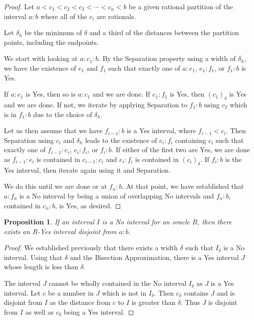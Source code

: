 \documentclass[12pt]{article}
\newtheorem{proposition}{Proposition}[subsection]
\begin{document}
\begin{proof}

Let $a < c_1 < c_2 < c_3 < \cdots < c_n < b$ be a given rational partition of the interval $a:b$ where all of the $c_i$ are rationals. 

Let $\delta_h$ be the minimum of $\delta$ and a third of the distances between the partition points, including the endpoints. 

We start with looking at $a:c_1:b$. By the Separation property using a width of $\delta_h$, we have the existence of $e_1$ and $f_1$ such that exactly one of $a:e_1$, $e_1:f_1$, or $f_1:b$ is Yes. 

If $a:e_1$ is Yes, then so is $a:c_1$ and we are done. If $e_1:f_1$ is Yes, then $(c_1)_\delta$ is Yes and we are done. If not, we iterate by applying Separation to $f_1:b$ using $c_2$ which is in $f_1:b$ due to the choice of $\delta_h$. 

Let us then assume that we have $f_{i-1}:b$ is a Yes interval, where $f_{i-1} < c_i$.  Then Separation using $c_i$ and $\delta_h$ leads to the existence of $e_i:f_i$ containing $c_i$ such that exactly one of $f_{i-1}:e_i$, $e_i:f_i$, or $f_i:b$. If either of the first two are Yes, we are done as $f_{i-1}:e_i$ is contained in $c_{i-1}:c_i$ and $e_i:f_i$ is contained in $(c_i)_\delta$. If $f_i:b$ is the Yes interval, then iterate again using it and Separation. 

We do this until we are done or at $f_n:b$. At that point, we have established that $a:f_n$ is a No interval by being a union of overlapping No intervals and $f_n:b$, contained in $c_n:b$, is Yes, as desired.
\end{proof}


\begin{proposition}\label{pr:no-is-disjoint}
    If an interval $I$ is a No interval for an oracle $R$, then there exists an $R$-Yes interval disjoint from $a:b$.
\end{proposition}

\begin{proof}
    We established previously that there exists a width $\delta$ such that $I_\delta$ is a No interval. Using that $\delta$ and the Bisection Approximation, there is a Yes interval $J$ whose length is less than $\delta$.

    The interval $J$ cannot be wholly contained in the No interval $I_\delta$ as $J$ is a Yes interval. Let $c$ be a number in $J$ which is not in $I_\delta$. Then $c_\delta$ contains $J$ and is disjoint from $I$ as the distance from $c$ to $I$ is greater than $\delta$. Thus $J$ is disjoint from $I$ as well as $c_\delta$ being a Yes interval. 
\end{proof}
\end{document}
